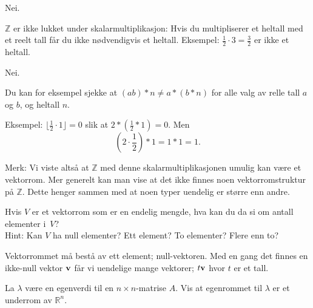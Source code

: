\begin{losning}

\begin{punkt}
Nei. 

\noindent
$\mathbb{Z}$ er ikke lukket under skalarmultiplikasjon: Hvis du multipliserer et heltall med et reelt tall får du ikke nødvendigvis et heltall. Eksempel: $\frac{1}{2}\cdot 3=\frac{3}{2}$ er ikke et heltall.
\end{punkt}

\begin{punkt}
Nei.

\noindent
Du kan for eksempel sjekke at $(ab)\ast n \neq a\ast (b\ast n)$ for alle valg av relle tall $a$ og $b$, og heltall $n$. 

\noindent
Eksempel: $\lfloor \frac{1}{2}\cdot 1 \rfloor =0$ slik at $2 \ast(\frac{1}{2}\ast 1)=0$. Men $$(2\cdot \frac{1}{2})\ast 1=1 \ast 1=1.$$


\noindent
Merk: Vi viste altså at $\mathbb{Z}$ med denne skalarmultiplikasjonen umulig kan være et vektorrom. Mer generelt kan man vise at det ikke finnes noen vektorromstruktur på $\mathbb{Z}$. Dette henger sammen med at noen typer uendelig er større enn andre.
\end{punkt}

\end{losning}

\begin{oppgave}
Hvis $V$ er et vektorrom som er en endelig mengde, hva kan du da si om
antall elementer i~$V$?
\\
Hint: Kan $V$ ha null elementer?  Ett element?  To elementer?  Flere
enn to?
\end{oppgave}

\begin{losning}
Vektorrommet må bestå av ett element; null-vektoren. Med en gang det finnes en ikke-null vektor $\mathbf{v}$ får vi uendelige mange vektorer; $t\mathbf{v}$ hvor $t$ er et tall.
\end{losning}


\begin{oppgave}
La $\lambda$ være en egenverdi til en $n\times n$-matrise $A$. Vis at egenrommet til $\lambda$ er et underrom av $\mathbb{R}^n$.
\end{oppgave}

